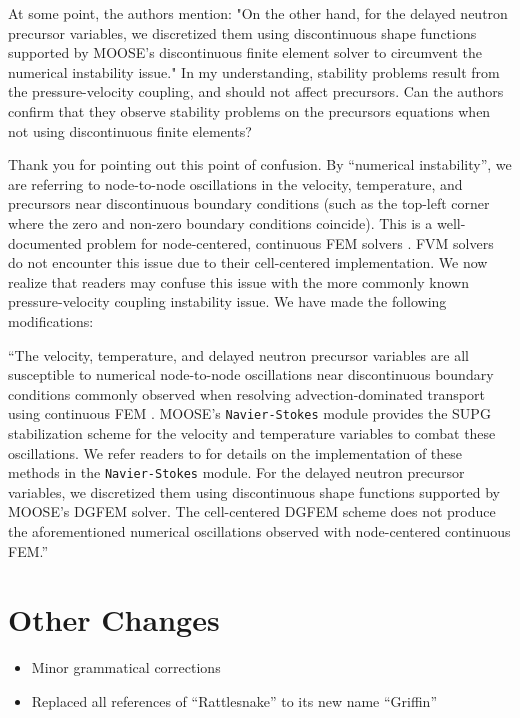 \documentclass[answers,11pt]{exam}
\begin{document}
\begin{questions}
        \question At some point, the authors mention:
"On the other hand, for the delayed neutron precursor variables, we discretized them using discontinuous shape functions supported by MOOSE's discontinuous finite element solver to circumvent the numerical instability issue."
In my understanding, stability problems result from the pressure-velocity coupling, and should not affect precursors. Can the authors confirm that  they observe stability problems on the precursors equations when not using discontinuous finite elements?

        \begin{solution}
        	Thank you for pointing out this point of confusion. By ``numerical
        	instability'', we are referring to node-to-node oscillations in the
        	velocity, temperature, and precursors near discontinuous
        	boundary conditions (such as the top-left corner where the zero and
        	non-zero boundary conditions coincide). This is a well-documented
        	problem for node-centered, continuous FEM solvers
        	\cite{kuhlmann_lid-driven_2018}. FVM solvers do not encounter
        	this issue due to their cell-centered implementation. We now
        	realize that readers may confuse this issue with the more commonly
        	known pressure-velocity coupling instability issue. We have made
        	the following modifications:
        	
        	``The velocity, temperature, and delayed neutron precursor variables are all susceptible to numerical node-to-node oscillations near discontinuous boundary conditions commonly observed when resolving advection-dominated transport using continuous FEM \cite{kuhlmann_lid-driven_2018}. MOOSE's \texttt{Navier-Stokes} module provides the SUPG stabilization scheme \cite{brooks_streamline_1982} for the velocity and temperature variables to combat these oscillations. We refer readers to \cite{peterson_overview_2018} for details on the implementation of these methods in the \texttt{Navier-Stokes} module. For the delayed neutron precursor variables, we discretized them using discontinuous shape functions supported by MOOSE's DGFEM solver. The cell-centered DGFEM scheme does not produce the aforementioned numerical oscillations observed with node-centered continuous FEM.''
        \end{solution}

\end{questions}

\section*{Other Changes}

\begin{itemize}
    \item Minor grammatical corrections
    \item Replaced all references of ``Rattlesnake'' to its new name
    ``Griffin''
\end{itemize}



\end{document}
